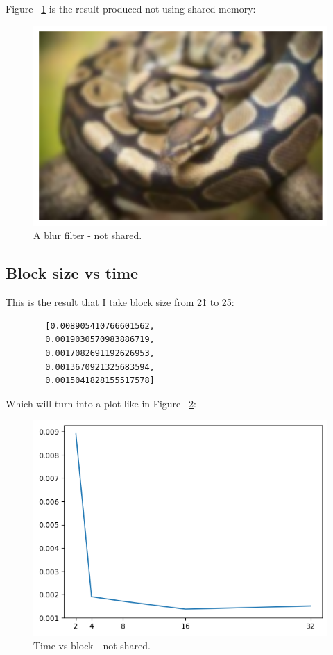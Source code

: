 \documentclass{article}
\begin{document}
	Figure ~\ref{fig:gpu_python} is the result produced not using shared memory:
	
	\begin{figure}
		\includegraphics[width=\linewidth]{gpu_python.png}
		\caption{A blur filter - not shared.}
		\label{fig:gpu_python}
	\end{figure}
	
	\subsection{Block size vs time}
	This is the result that I take block size from 2\^1 to 2\^5:
	\begin{verbatim}
		[0.008905410766601562,
		0.0019030570983886719,
		0.0017082691192626953,
		0.0013670921325683594,
		0.0015041828155517578]
	\end{verbatim}
	Which will turn into a plot like in Figure ~\ref{fig:plot_not_shared}:
	\begin{figure}
		\includegraphics[width=\linewidth]{plot_not_shared.png}
		\caption{Time vs block - not shared.}
		\label{fig:plot_not_shared}
	\end{figure}
	
\end{document}

